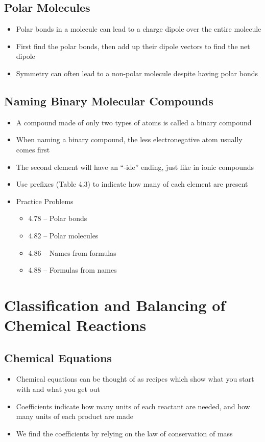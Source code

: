 \documentclass[12pt, openany, letterpaper]{memoir}
\begin{document}
\section{Polar Molecules}
\begin{itemize}
	\item Polar bonds in a molecule can lead to a charge dipole over the entire molecule
	\item First find the polar bonds, then add up their dipole vectors to find the net dipole
	\item Symmetry can often lead to a non-polar molecule despite having polar bonds
\end{itemize}
\section{Naming Binary Molecular Compounds}
\begin{itemize}
	\item A compound made of only two types of atoms is called a binary compound
	\item When naming a binary compound, the less electronegative atom usually comes first
	\item The second element will have an ``-ide'' ending, just like in ionic compounds
	\item Use prefixes (Table 4.3) to indicate how many of each element are present
	\item Practice Problems
	\begin{itemize}
		\item 4.78 -- Polar bonds
		\item 4.82 -- Polar molecules
		\item 4.86 -- Names from formulas
		\item 4.88 -- Formulas from names
	\end{itemize}
\end{itemize}

\chapter{Classification and Balancing of Chemical Reactions}
\section{Chemical Equations}
\begin{itemize}
	\item Chemical equations can be thought of as recipes which show what you start with and what you get out
	\item Coefficients indicate how many units of each reactant are needed, and how many units of each product are made
	\item We find the coefficients by relying on the law of conservation of mass
\end{itemize}
\end{document}
